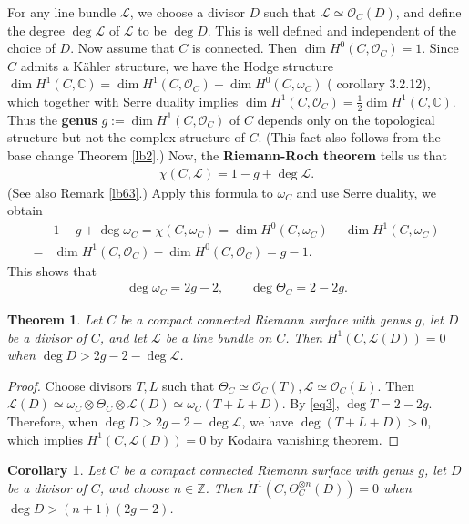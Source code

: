 \documentclass[12pt,b5paper,notitlepage]{report}
\theoremstyle{definition}
\theoremstyle{plain}
\newtheorem{thm}[df]{Theorem}
\newtheorem{co}[df]{Corollary}
\newcommand{\scr}{\mathscr}
\numberwithin{equation}{section}
\begin{document}
For any line bundle $\scr L$, we choose a divisor $D$ such that $\scr L\simeq\scr O_C(D)$, and  define the degree $\deg \scr L $\index{deg@$\deg \scr L$} of $\scr L$ to be $\deg D$. This is well defined and independent of the choice of $D$. Now assume that $C$ is connected. Then $\dim H^0(C,\scr O_C)=1$. Since $C$ admits a  K\"ahler structure, we have the Hodge structure $\dim H^1(C,\mathbb C)=\dim H^1(C,\scr O_C)+\dim H^0(C,\omega_C)$ (\cite{Huy06} corollary 3.2.12), which together with Serre duality implies $\dim H^1(C,\scr O_C)=\frac 12\dim H^1(C,\mathbb C)$. Thus the \textbf{genus} $g:=\dim H^1(C,\scr O_C)$ of $C$ depends only on the topological structure but not the complex structure of $C$. (This fact also follows from the base change Theorem \ref{lb2}.) Now, the \textbf{Riemann-Roch theorem} tells us that
\begin{align}
\chi(C,\scr L)=1-g+\deg\scr L.\label{eq162}
\end{align}
(See also Remark \ref{lb63}.) Apply this formula to $\omega_C$ and use Serre duality, we obtain
\begin{align*}
&1-g+\deg\omega_C=\chi(C,\omega_C)=\dim H^0(C,\omega_C)-\dim H^1(C,\omega_C)\\
=&\dim H^1(C,\scr O_C)-\dim H^0(C,\scr O_C)=g-1.
\end{align*}
This shows that
\begin{align}
\deg\omega_C=2g-2,\qquad \deg\Theta_C=2-2g.\label{eq3}
\end{align}
 
\begin{thm}\label{lb3}
Let $C$ be a compact connected Riemann surface with genus $g$, let $D$ be a divisor of $C$, and let $\scr L$ be a line bundle on $C$. Then   $H^1(C,\scr L(D))=0$ when $\deg D>2g-2-\deg\scr L$.
\end{thm}

\begin{proof}
	Choose  divisors $T,L$ such that $\Theta_C\simeq\scr O_C(T),\scr L\simeq\scr O_C(L)$. Then $\scr L(D)\simeq\omega_C\otimes\Theta_C\otimes\scr L(D)\simeq\omega_C(T+L+D)$. By \eqref{eq3}, $\deg T=2-2g$. Therefore, when $\deg D>2g-2-\deg\scr L$, we have $\deg(T+L+D)>0$, which implies $H^1(C,\scr L(D))=0$ by Kodaira vanishing theorem.
\end{proof}

\begin{co}\label{lb5}
Let $C$ be a compact connected Riemann surface with genus $g$, let $D$ be a divisor of $C$, and choose $n\in\mathbb Z$. Then   $H^1(C,\Theta_C^{\otimes n}(D))=0$ when $\deg D>(n+1)(2g-2)$.
\end{co}
\end{document}
